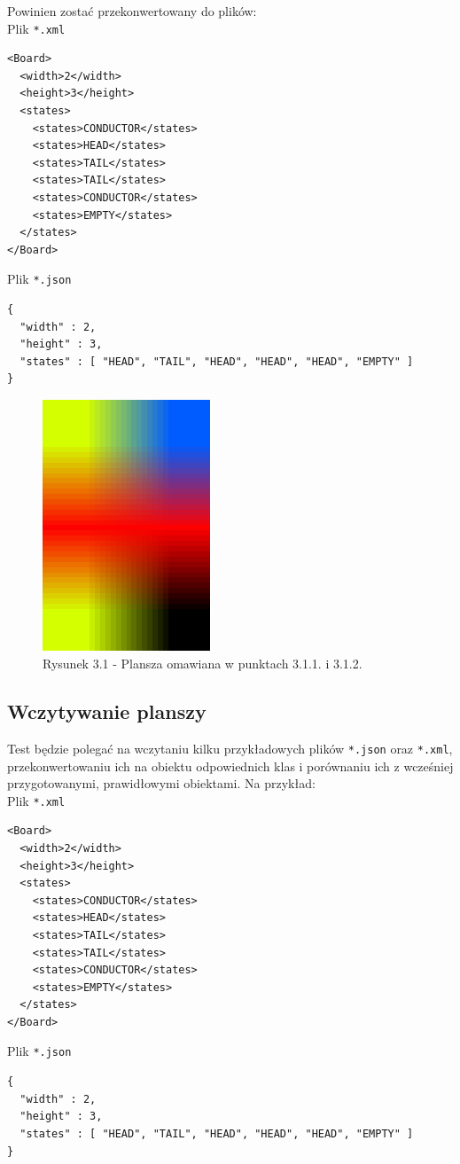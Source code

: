 \documentclass{report}
\begin{document}
Powinien zostać przekonwertowany do plików:\\

\noindent Plik \texttt{*.xml}
\begin{verbatim}
<Board>
  <width>2</width>
  <height>3</height>
  <states>
    <states>CONDUCTOR</states>
    <states>HEAD</states>
    <states>TAIL</states>
    <states>TAIL</states>
    <states>CONDUCTOR</states>
    <states>EMPTY</states>
  </states>
</Board>
\end{verbatim}
\noindent Plik \texttt{*.json}
\begin{verbatim}
{
  "width" : 2,
  "height" : 3,
  "states" : [ "HEAD", "TAIL", "HEAD", "HEAD", "HEAD", "EMPTY" ]
}
\end{verbatim}

 \begin{figure}
	\hspace*{3.5cm}\includegraphics[width=5cm]{przyklad-planszy-wireworld}
	\caption{Rysunek 3.1 - Plansza omawiana w punktach 3.1.1. i 3.1.2.}
\end{figure}

\subsection{Wczytywanie planszy}
Test będzie polegać na wczytaniu kilku przykładowych plików \texttt{*.json} oraz \texttt{*.xml}, przekonwertowaniu ich na obiektu odpowiednich klas i porównaniu ich z wcześniej przygotowanymi, prawidłowymi obiektami. Na przykład: \\

\noindent Plik \texttt{*.xml}
\begin{verbatim}
<Board>
  <width>2</width>
  <height>3</height>
  <states>
    <states>CONDUCTOR</states>
    <states>HEAD</states>
    <states>TAIL</states>
    <states>TAIL</states>
    <states>CONDUCTOR</states>
    <states>EMPTY</states>
  </states>
</Board>
\end{verbatim}
\noindent Plik \texttt{*.json}
\begin{verbatim}
{
  "width" : 2,
  "height" : 3,
  "states" : [ "HEAD", "TAIL", "HEAD", "HEAD", "HEAD", "EMPTY" ]
}
\end{verbatim}
\end{document}
